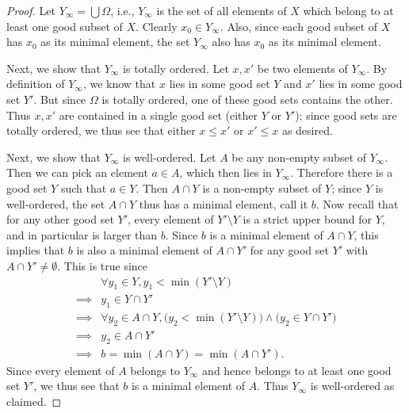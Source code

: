 \begin{proof}
    Let \(Y_{\infty} = \bigcup \Omega\), i.e., \(Y_{\infty}\) is the set of all elements of \(X\) which belong to at least one good subset of \(X\).
    Clearly \(x_0 \in Y_{\infty}\).
    Also, since each good subset of \(X\) has \(x_0\) as its minimal element, the set \(Y_{\infty}\) also has \(x_0\) as its minimal element.

    Next, we show that \(Y_{\infty}\) is totally ordered.
    Let \(x, x'\) be two elements of \(Y_{\infty}\).
    By definition of \(Y_{\infty}\), we know that \(x\) lies in some good set \(Y\) and \(x'\) lies in some good set \(Y'\).
    But since \(\Omega\) is totally ordered, one of these good sets contains the other.
    Thus \(x, x'\) are contained in a single good set (either \(Y\) or \(Y'\));
    since good sets are totally ordered, we thus see that either \(x \leq x'\) or \(x' \leq x\) as desired.

    Next, we show that \(Y_{\infty}\) is well-ordered.
    Let \(A\) be any non-empty subset of \(Y_{\infty}\).
    Then we can pick an element \(a \in A\), which then lies in \(Y_{\infty}\).
    Therefore there is a good set \(Y\) such that \(a \in Y\).
    Then \(A \cap Y\) is a non-empty subset of \(Y\);
    since \(Y\) is well-ordered, the set \(A \cap Y\) thus has a minimal element, call it \(b\).
    Now recall that for any other good set \(Y'\), every element of \(Y' \setminus Y\) is a strict upper bound for \(Y\), and in particular is larger than \(b\).
    Since \(b\) is a minimal element of \(A \cap Y\), this implies that \(b\) is also a minimal element of \(A \cap Y'\) for any good set \(Y'\) with \(A \cap Y' \neq \emptyset\).
    This is true since
    \begin{align*}
                 & \forall y_1 \in Y, y_1 < \min(Y' \setminus Y)                                                    \\
        \implies & y_1 \in Y \cap Y'                                                                                \\
        \implies & \forall y_2 \in A \cap Y, \big(y_2 < \min(Y' \setminus Y)\big) \land \big(y_2 \in Y \cap Y'\big) \\
        \implies & y_2 \in A \cap Y'                                                                                \\
        \implies & b = \min(A \cap Y) = \min(A \cap Y').
    \end{align*}
    Since every element of \(A\) belongs to \(Y_{\infty}\) and hence belongs to at least one good set \(Y'\), we thus see that \(b\) is a minimal element of \(A\).
    Thus \(Y_{\infty}\) is well-ordered as claimed.


\end{proof}
